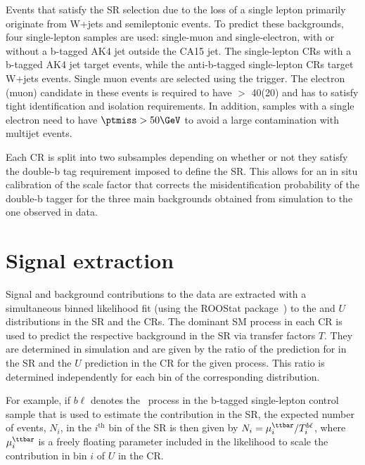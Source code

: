 Events that satisfy the SR selection due to the loss of a single lepton primarily originate from W+jets and semileptonic \ttbar events.
To predict these backgrounds, four single-lepton samples are used: single-muon and single-electron, with or without a b-tagged AK4 jet outside the CA15 jet.
The single-lepton CRs with a b-tagged AK4 jet target \ttbar events, while the anti-b-tagged single-lepton CRs target W+jets events.
Single muon events are selected using the \MET trigger.
The electron (muon) candidate in these events is required to have \pt $>$ 40\GeV (20\GeV) and has to satisfy tight identification and isolation requirements.
In addition, samples with a single electron need to have $\ptmiss>50\GeV$ to avoid a large contamination with multijet events.


Each CR is split into two subsamples depending on whether or
not they satisfy the double-b tag requirement imposed to define the SR. This allows for an in situ calibration of the scale factor that corrects the misidentification probability of the double-b tagger for the three main backgrounds obtained from simulation to the one observed in data. 

\section{Signal extraction}

Signal and background contributions to the data are extracted with a simultaneous binned likelihood fit (using the ROOStat package~\cite{roostats}) to the \MET and $U$ distributions in the SR and the CRs.
%
The dominant SM process in each CR is used to predict the respective background in the SR via transfer factors $T$. They are determined in simulation and are given by the ratio of the prediction for \ptmiss in the SR and the $U$ prediction in the CR for the given process. This ratio is determined independently for each bin of the corresponding distribution.
  
For example, if $b\ell$ denotes the \ttbar~process in the b-tagged single-lepton control sample that is used to estimate the \ttbar contribution in the SR, the expected number of \ttbar events, $N_{i}$, in the $i^\text{th}$ bin of the SR is then given by $N_{i}= \mu^{\ttbar}_{i}/T^{b\ell}_{i}$, where  $\mu^{\ttbar}_i$ is a freely floating parameter included in the likelihood to scale the \ttbar contribution in bin $i$ of $U$ in the CR.

